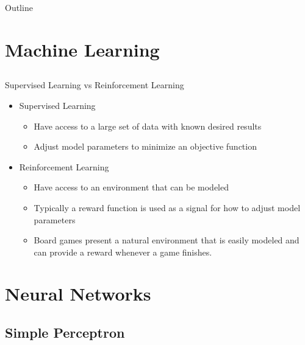 


\begin{frame}[plain] 
\titlepage
\end{frame}

\begin{frame}[plain]{Outline}
\tableofcontents
\end{frame}

\section{Machine Learning}
\subsection{}

\begin{frame}{Supervised Learning vs Reinforcement Learning}
\begin{itemize}
\item Supervised Learning
\begin{itemize}
\item Have access to a large set of data with known desired results
\item Adjust model parameters to minimize an objective function
\end{itemize}
\item Reinforcement Learning
\begin{itemize}
\item Have access to an environment that can be modeled
\item Typically a reward function is used as a signal for how to adjust model parameters
\item Board games present a natural environment that is easily modeled and can provide a reward whenever a game finishes.
\end{itemize}
\end{itemize}
\end{frame}

\section{Neural Networks}
\subsection{Simple Perceptron}

